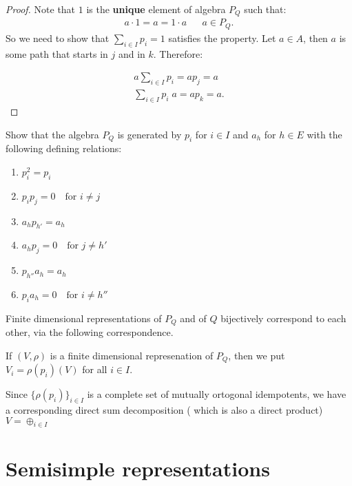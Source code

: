 \begin{proof}

Note that \(1\) is the \textbf{unique} element of algebra \(P_{Q}\) such that:
\begin{align*}a\cdot 1=a=1\cdot a && a\in P_Q.\end{align*}
So we need to show that \(\sum _{i\in I}p_{i}=1\) satisfies the property. Let \(a\in A\), then \(a\) is some path that starts in \(j\) and in \(k\). Therefore:

\begin{gather*}a\sum _{i\in I}p_{i}=ap_{j}=a \\
\sum _{i\in I}p_{i}\; a=ap_{k}=a.\end{gather*}
\end{proof}

\begin{thm}
Show that the algebra \(P_{Q}\) is generated by \(p_{i}\) for \(i\in I\) and \(a_{h}\) for \(h\in E\) with the following defining relations:

\begin{enumerate}
  \item \(p_{i}^{2} =p_{i}\)
  \item \(p_{i}p_{j}=0 \quad \text{for } i\neq j \)
  \item \(a_{h}p_{h'}=a_{h}\)
  \item \(a_{h}p_{j}=0\quad \text{for }j\neq h'\)
  \item \(p_{h''}a_{h}=a_{h}\)
  \item \(p_{i} a_{h}=0 \quad \text{for } i\neq h''\)
\end{enumerate}

\end{thm}

\begin{prop}
Finite dimensional representations of \(P_{Q}\) and of \(Q\) bijectively correspond to each other, via the following correspondence.

If \((V,\rho )\) is a finite dimensional represenation of \(P_{Q}\), then we put \(V_{i}=\rho (p_{i})(V)\) for all \(i\in I\).

Since \(\{\rho (p_{i})\}_{i\in I}\) is a complete set of mutually ortogonal idempotents, we have a corresponding direct sum decomposition ( which is also a direct product) \(V=\oplus _{i\in I}\)

\end{prop}
\newpage
\section{Semisimple representations}

